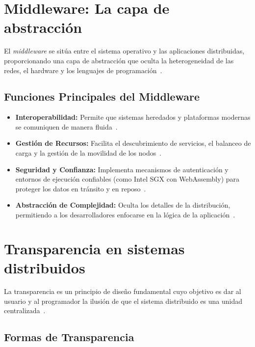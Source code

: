 \documentclass[12pt,a4paper]{article}
\begin{document}
\section{Middleware: La capa de abstracción}

El \textit{middleware} se sitúa entre el sistema operativo y las aplicaciones distribuidas, proporcionando una capa de abstracción que oculta la heterogeneidad de las redes, el hardware y los lenguajes de programación~\cite{r10}.

\subsection{Funciones Principales del Middleware}

\begin{itemize}
	\item \textbf{Interoperabilidad:} Permite que sistemas heredados y plataformas modernas se comuniquen de manera fluida~\cite{r13}.

	\item \textbf{Gestión de Recursos:} Facilita el descubrimiento de servicios, el balanceo de carga y la gestión de la movilidad de los nodos~\cite{r04}.

	\item \textbf{Seguridad y Confianza:} Implementa mecanismos de autenticación y entornos de ejecución confiables (como Intel SGX con WebAssembly) para proteger los datos en tránsito y en reposo~\cite{r05}.

	\item \textbf{Abstracción de Complejidad:} Oculta los detalles de la distribución, permitiendo a los desarrolladores enfocarse en la lógica de la aplicación~\cite{r14}.
\end{itemize}

\section{Transparencia en sistemas distribuidos}

La transparencia es un principio de diseño fundamental cuyo objetivo es dar al usuario y al programador la ilusión de que el sistema distribuido es una unidad centralizada~\cite{r15}.

\subsection{Formas de Transparencia}
\end{document}
